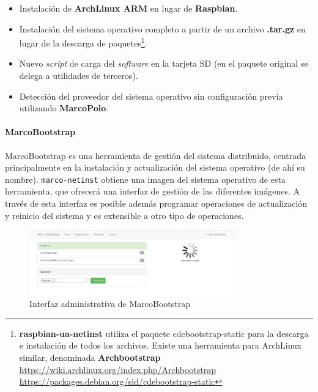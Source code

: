 \begin{itemize}
	\item Instalación de \textbf{ArchLinux ARM} en lugar de \textbf{Raspbian}.
	\item Instalación del sistema operativo completo a partir de un archivo \textbf{.tar.gz} en lugar de la descarga de paquetes\footnote{\textbf{raspbian-ua-netinst} utiliza el paquete cdebootstrap-static para la descarga e instalación de todos los archivos. Existe una herramienta para ArchLinux similar, denominada \textbf{Archbootstrap}\\
	\href{https://wiki.archlinux.org/index.php/Archbootstrap}{https://wiki.archlinux.org/index.php/Archbootstrap}\\
	\href{https://packages.debian.org/sid/cdebootstrap-static}{https://packages.debian.org/sid/cdebootstrap-static}}.
	\item Nuevo \textit{script} de carga del \textit{software} en la tarjeta SD (en el paquete original se delega a utilidades de terceros).
	\item Detección del proveedor del sistema operativo sin configuración previa utilizando \textbf{MarcoPolo}.
\end{itemize}


\paragraph{MarcoBootstrap\\}
\label{marcobootstrap}
MarcoBootstrap es una herramienta de gestión del sistema distribuido, centrada principalmente en la instalación y actualización del sistema operativo (de ahí su nombre). \texttt{marco-netinst} obtiene una imagen del sistema operativo de esta herramienta, que ofrecerá una interfaz de gestión de las diferentes imágenes. A través de esta interfaz es posible además programar operaciones de actualización y reinicio del sistema y es extensible a otro tipo de operaciones.

\begin{figure}[H]
	\centering
	\includegraphics[width=0.8\textwidth]{Chapters/Chapter5/Figures/marcobootstrap}
	\caption{Interfaz administrativa de MarcoBootstrap}
\end{figure}

